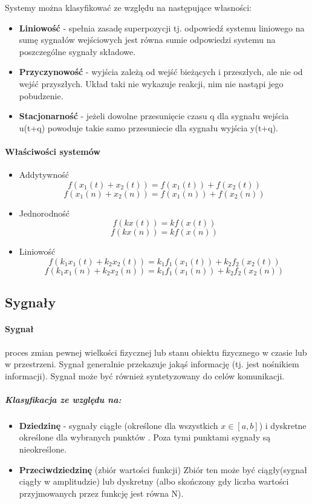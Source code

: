 \documentclass[a4paper,twoside]{report}
\begin{document}
Systemy można klasyfikować ze względu na następujące własności:
\begin{itemize}
\item \textbf{Liniowość} - spełnia zasadę superpozycji tj. odpowiedź systemu liniowego na sumę sygnałów wejściowych jest równa sumie odpowiedzi systemu na poszczególne sygnały składowe.
\item \textbf{Przyczynowość} - wyjścia zależą od wejść bieżących i przeszłych, ale nie od wejść przyszłych. Układ taki nie wykazuje reakcji, nim nie nastąpi jego pobudzenie. 
\item \textbf{Stacjonarność} - jeżeli dowolne przesunięcie czasu q dla sygnału wejścia u(t+q) powoduje takie samo przesuniecie dla sygnału wyjścia y(t+q).
\end{itemize}

\paragraph{Właściwości systemów}
\begin{itemize}
\item Addytywność
\[f(x_1(t)+x_2(t))=f(x_1(t))+f(x_2(t))\]
\[f(x_1(n)+x_2(n))=f(x_1(n))+f(x_2(n))\]
\item Jednorodność
\[f(kx(t))=kf(x(t))\]
\[f(kx(n))=kf(x(n))\]
\item Liniowość
\[f(k_1x_1(t)+k_2x_2(t))=k_1f_1(x_1(t))+k_2f_2(x_2(t))\]
\[f(k_1x_1(n)+k_2x_2(n))=k_1f_1(x_1(n))+k_2f_2(x_2(n))\]
\end{itemize}

\subsection{Sygnały}
\paragraph{Sygnał}proces zmian pewnej wielkości fizycznej lub stanu obiektu fizycznego w czasie lub w przestrzeni. Sygnał generalnie przekazuje jakąś informację (tj. jest nośnikiem informacji). Sygnał może być również syntetyzowany do celów komunikacji. 

\subparagraph{Klasyfikacja ze względu na:}
\begin{itemize}
\item \textbf{Dziedzinę} - sygnały ciągłe (określone dla wszystkich $x\in [a,b]$) i dyskretne określone dla wybranych punktów . Poza tymi punktami sygnały są nieokreślone. 
\item \textbf{Przeciwdziedzinę} (zbiór wartości funkcji) Zbiór ten może być ciągły(sygnał ciągły w amplitudzie) lub dyskretny (albo skończony gdy liczba wartości przyjmowanych przez funkcję jest równa N).  
\end{itemize}
\end{document}
